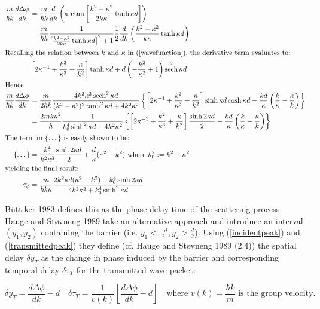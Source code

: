 \documentclass{article}
\DeclareMathOperator{\sech}{sech}
\begin{document}
\begin{align}
	\frac{m}{\hbar k}\frac{d\Delta\phi}{dk}&=\frac{m}{\hbar k}\frac{d}{dk}\left(\arctan{\left[\frac{k^2-\kappa^2}{2k\kappa}\tanh{\kappa d}\right]}\right) \\
					       &=\frac{m}{\hbar k}\frac{1}{\left[\frac{k^2-\kappa^2}{2k\kappa}\tanh{\kappa d}\right]^2+1}\frac{1}{2}\frac{d}{dk}\left(\frac{k^2-\kappa^2}{k\kappa}\tanh{\kappa d}\right) \\ \intertext{Recalling the relation between $k$ and $\kappa$ in (\ref{wavefunction}), the derivative term evaluates to:}
					       &\left[2\kappa^{-1}+\frac{k^2}{\kappa^3}+\frac{\kappa}{k^2}\right]\tanh{\kappa d} + d\left(-\frac{k^2}{\kappa^2}+1\right)\sech^2{\kappa d}\\ \intertext{Hence}
	\frac{m}{\hbar k}\frac{d\Delta\phi}{dk}&=\frac{m}{2\hbar k}\frac{4k^2\kappa^2\sech^2{\kappa d}}{(k^2-\kappa^2)^2\tanh^2{\kappa d}+4k^2\kappa^2}\left\{\left[2\kappa^{-1}+\frac{k^2}{\kappa^3}+\frac{\kappa}{k^2}\right]\sinh{\kappa d}\cosh{\kappa d}-\frac{kd}{\kappa}\left(\frac{k}{\kappa}-\frac{\kappa}{k}\right)\right\}\\
					       &=\frac{2mk\kappa^2}{\hbar}\frac{1}{k_0^4\sinh^2{\kappa d}+4k^2\kappa^2}\left\{\left[2\kappa^{-1}+\frac{k^2}{\kappa^3}+\frac{\kappa}{k^2}\right]\frac{\sinh{2\kappa d}}{2}-\frac{kd}{\kappa}\left(\frac{k}{\kappa}-\frac{\kappa}{k}\right)\right\} \\ \intertext{The term in \{\dots\} is easily shown to be:}
	\{\dots\} &= \frac{k_0^4}{k^2\kappa^3}\frac{\sinh{2\kappa d}}{2}+\frac{d}{\kappa}(\kappa^2-k^2) \text{ where } k_0^2 := k^2+\kappa^2\\ \intertext{yielding the final result:}
	\tau_\phi &= \frac{m}{\hbar k \kappa}\frac{2k^2\kappa d(\kappa^2-k^2)+k_0^4\sinh{2\kappa d}}{4k^2\kappa^2+k_0^4\sinh^2{\kappa d}} \label{phasedelaytime}
\end{align}

\noindent B{\"u}ttiker 1983 defines this as the phase-delay time of the scattering process. Hauge and St{\o}vneng 1989 take an alternative approach and introduce an interval $(y_1, y_2)$ containing the barrier (i.e. $y_1<\frac{-d}{2},y_2>\frac{d}{2}$). Using (\ref{incidentpeak}) and (\ref{transmittedpeak}) they define (cf. Hauge and St{\o}vneng 1989 (2.4)) the spatial delay $\delta y_T$ as the change in phase induced by the barrier and corresponding temporal delay $\delta\tau_T$ for the transmitted wave packet:

\begin{equation}
	\delta y_T = \frac{d\Delta\phi}{dk}-d \quad \delta\tau_T=\frac{1}{v(k)} \left[\frac{d\Delta\phi}{dk}-d\right] \quad \text{where $v(k) = \frac{\hbar k}{m}$ is the group velocity.}
	\label{transmittedphaseshift}
\end{equation}
\end{document}

